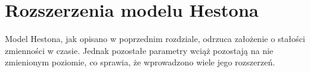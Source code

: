 \documentclass{pracamgr}
\begin{document}
\chapter{Rozszerzenia modelu Hestona}

Model Hestona, jak opisano w poprzednim rozdziale, odrzuca założenie o stałości zmienności w czasie. Jednak pozostałe parametry wciąż pozostają na nie zmienionym poziomie, 
co sprawia, że wprowadzono wiele jego rozszerzeń. 













\end{document}
